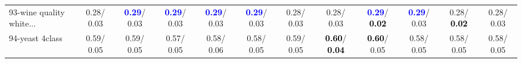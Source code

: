 \begin{table}[h]
\begin{center}
{\begin{tabular}{lc|c|c|c|c|c|c|c|c|c|c}
93-wine quality white... &   0.28/  0.03 & \textcolor{blue}{\textbf{  0.29}}/  0.03 & \textcolor{blue}{\textbf{  0.29}}/  0.03 & \textcolor{blue}{\textbf{  0.29}}/  0.03 & \textcolor{blue}{\textbf{  0.29}}/  0.03 &   0.28/  0.03 &   0.28/  0.03 & \textcolor{blue}{\textbf{  0.29}}/\textcolor{black}{\textbf{  0.02}} & \textcolor{blue}{\textbf{  0.29}}/  0.03 &   0.28/\textcolor{black}{\textbf{  0.02}} &   0.28/  0.03 \\
94-yeast 4class &   0.59/  0.05 &   0.59/  0.05 &   0.57/  0.05 &   0.58/  0.06 &   0.58/  0.05 &   0.59/  0.05 & \textcolor{black}{\textbf{  0.60}}/\textcolor{black}{\textbf{  0.04}} & \textcolor{black}{\textbf{  0.60}}/  0.05 &   0.58/  0.05 &   0.58/  0.05 &   0.58/  0.05 \\\end{tabular}}\label{stratsBalAcc2bIELM}
\end{center}
\end{table}